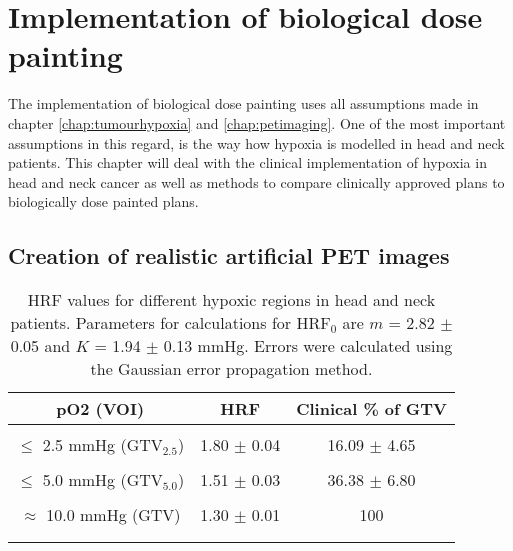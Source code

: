 \section{Implementation of biological dose painting}\label{chapt:clinicalimplementation}
The implementation of biological dose painting uses all assumptions made in chapter \ref{chap:tumourhypoxia} and \ref{chap:petimaging}. One of the most important assumptions in this regard, is the way how hypoxia is modelled in head and neck patients. This chapter will deal with the clinical implementation of hypoxia in head and neck cancer as well as methods to compare clinically approved plans to biologically dose painted plans.
\subsection{Creation of realistic artificial PET images}
\begin{table}[b]
\centering
\small
\begin{tabular}{ccc}
\toprule
pO2 (VOI) & HRF & Clinical \% of GTV\\
\midrule\\
$\leq$ 2.5 mmHg (GTV$_{2.5}$) & 1.80 $\pm$ 0.04 & 16.09 $\pm$ 4.65\\\\
$\leq$ 5.0 mmHg (GTV$_{5.0}$) & 1.51 $\pm$ 0.03 & 36.38 $\pm$ 6.80\\\\
$\approx$ 10.0 mmHg (GTV)& 1.30 $\pm$ 0.01 & 100\\\\
\bottomrule\\
\end{tabular}
\caption{HRF values for different hypoxic regions in head and neck patients. Parameters for calculations for HRF$_0$ are $m$ = 2.82 $\pm$ 0.05 and $K$ = 1.94 $\pm$ 0.13 mmHg. Errors were calculated using the Gaussian error propagation method.}
\label{tab:HRFparameters}
\end{table}
